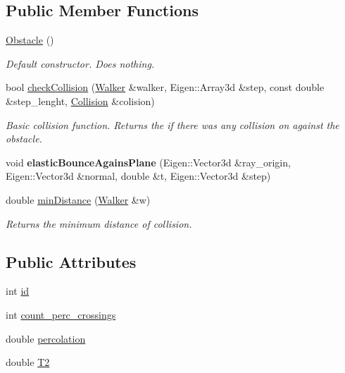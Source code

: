 \subsection*{Public Member Functions}
\begin{DoxyCompactItemize}
\item 
\mbox{\label{class_obstacle_a8f734072321fa06a7b7dae2d5f50f352}} 
\hyperlink{class_obstacle_a8f734072321fa06a7b7dae2d5f50f352}{Obstacle} ()
\begin{DoxyCompactList}\small\item\em Default constructor. Does nothing. \end{DoxyCompactList}\item 
bool \hyperlink{class_obstacle_af11af63f11595304ff6d5c1785c03da5}{check\+Collision} (\hyperlink{class_walker}{Walker} \&walker, Eigen\+::\+Array3d \&step, const double \&step\+\_\+lenght, \hyperlink{class_collision}{Collision} \&colision)
\begin{DoxyCompactList}\small\item\em Basic collision function. Returns the if there was any collision on against the obstacle. \end{DoxyCompactList}\item 
\mbox{\label{class_obstacle_a5316aabce6765c943d131aa3d5018f8d}} 
void {\bfseries elastic\+Bounce\+Agains\+Plane} (Eigen\+::\+Vector3d \&ray\+\_\+origin, Eigen\+::\+Vector3d \&normal, double \&t, Eigen\+::\+Vector3d \&step)
\item 
double \hyperlink{class_obstacle_a742e9d6ea940b33545cef4f1f2d58566}{min\+Distance} (\hyperlink{class_walker}{Walker} \&w)
\begin{DoxyCompactList}\small\item\em Returns the minimum distance of collision. \end{DoxyCompactList}\end{DoxyCompactItemize}
\subsection*{Public Attributes}
\begin{DoxyCompactItemize}
\item 
int \hyperlink{class_obstacle_a02e049a3395138a0dc6194af0112e2b0}{id}
\item 
int \hyperlink{class_obstacle_aaa096d441fd095c7bbe924d1a78a8e23}{count\+\_\+perc\+\_\+crossings}
\item 
double \hyperlink{class_obstacle_a7afe63ee05b482c526591c981b22cf54}{percolation}
\item 
double \hyperlink{class_obstacle_a374f9b4486f63abce9696f5fe3a13e8e}{T2}
\end{DoxyCompactItemize}


